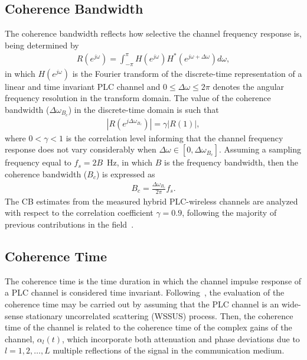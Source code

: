 \documentclass[journal]{IEEEtran}
\begin{document}
\subsection{Coherence Bandwidth}
The coherence bandwidth reflects how selective the channel frequency response is, being determined by
\begin{eqnarray}
	R(e^{j\omega})=\int_{-\pi}^{\pi} H(e^{j\omega})H^*(e^{j\omega+\Delta\omega})d \omega,
	\label{eq:CB}
\end{eqnarray}
in which $H(e^{j\omega})$ is the Fourier transform of the discrete-time representation of a linear and time invariant PLC channel and  $0 \leq \Delta \omega \leq 2\pi$ denotes the angular frequency resolution in the transform domain. The value of the coherence bandwidth ($\Delta \omega_{B_c}$) in the discrete-time domain is such that
\begin{eqnarray}
|R(e^{j\Delta \omega_{B_c}})|=\gamma|R(1)|,
\label{eq:CB}
\end{eqnarray}
where $0<\gamma<1$ is the correlation level informing that the channel frequency response does not vary considerably when $\Delta \omega \in [0,\Delta \omega_{B_c}]$. Assuming a sampling frequency equal to $f_s=2B$~Hz, in which $B$ is the frequency bandwidth, then the coherence bandwidth ($B_c$) is expressed as
\begin{eqnarray}
B_c=\frac{\Delta \omega_{B_c}}{2\pi}f_s.
\label{eq:CB}
\end{eqnarray}
The CB estimates from the measured hybrid PLC-wireless channels are analyzed with respect to the correlation coefficient $\gamma = 0.9$, following the majority of previous contributions in the field~\cite{REF_28}. 

\subsection{Coherence Time}
The coherence time is the time duration in which the channel impulse response of a PLC channel is considered time invariant. Following~\cite{Picorone2014}, the evaluation of the coherence time may be carried out by assuming that the PLC channel is an wide-sense stationary uncorrelated scattering (WSSUS) process. Then, the coherence time of the channel is related to the coherence time of the complex gains of the channel, $\alpha_l(t)$, which incorporate both attenuation and phase deviations due to $l = 1,2,\ldots,L$ multiple reflections of the signal in the communication medium.  
\end{document}

